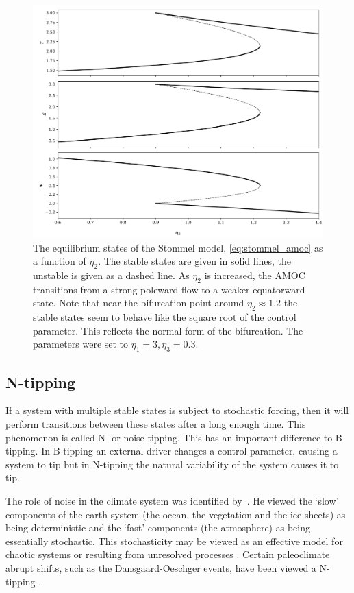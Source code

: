 \begin{figure}
  \centering
  \includegraphics[width=\textwidth,keepaspectratio]{stommel}
  \caption[The Stommel Model of the AMOC]{The equilibrium states of the Stommel model, \cref{eq:stommel_amoc} as a function of $\eta_2$. The stable states are given in solid lines,
    the unstable is given as a dashed line. As $\eta_2$ is increased, the AMOC transitions from a strong poleward flow to a weaker equatorward state. Note that near the
    bifurcation point around $\eta_2 \approx 1.2$ the stable states seem to behave like the square root of the control parameter. This reflects the normal form of
    the bifurcation. The parameters were set to $\eta_1 = 3,\eta_3=0.3$.}
  \label{fig:stommel_amoc}
\end{figure}
\subsection{N-tipping}
If a system with multiple stable states is subject to stochastic forcing, then it will perform transitions between these states after a long enough time. This
phenomenon is called N- or noise-tipping. This has an important difference to B-tipping. In B-tipping an external driver changes a control parameter, causing a system to tip
but in N-tipping the natural variability of the system causes it to tip.

The role of noise in the climate system was identified by~\cite{Hasselmann1976}. He viewed the `slow' components of the earth system (the ocean, the vegetation and the ice sheets) as being
deterministic and the `fast' components (the atmosphere) as being essentially stochastic. This stochasticity may be viewed as an effective model for chaotic systems \parencite{Lorenz1963}
or resulting from unresolved processes \parencite{Palmer2009}. Certain paleoclimate abrupt shifts, such as the Dansgaard-Oeschger events, have been viewed a N-tipping \parencite{Ditlevsen1999}.

